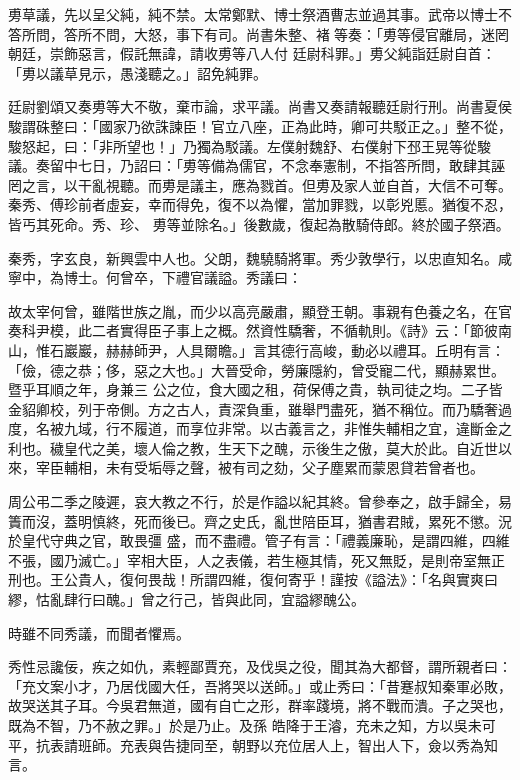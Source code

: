 \begin{pinyinscope}
 旉草議，先以呈父純，純不禁。太常鄭默、博士祭酒曹志並過其事。武帝以博士不答所問，答所不問，大怒，事下有司。尚書朱整、褚等奏：「旉等侵官離局，迷罔朝廷，崇飾惡言，假託無諱，請收旉等八人付
 廷尉科罪。」旉父純詣廷尉自首：「旉以議草見示，愚淺聽之。」詔免純罪。



 廷尉劉頌又奏旉等大不敬，棄市論，求平議。尚書又奏請報聽廷尉行刑。尚書夏侯駿謂硃整曰：「國家乃欲誅諫臣！官立八座，正為此時，卿可共駁正之。」整不從，駿怒起，曰：「非所望也！」乃獨為駁議。左僕射魏舒、右僕射下邳王晃等從駿議。奏留中七日，乃詔曰：「旉等備為儒官，不念奉憲制，不指答所問，敢肆其誣罔之言，以干亂視聽。而旉是議主，應為戮首。但旉及家人並自首，大信不可奪。秦秀、傅珍前者虛妄，幸而得免，復不以為懼，當加罪戮，以彰兇慝。猶復不忍，皆丐其死命。秀、珍、
 旉等並除名。」後數歲，復起為散騎侍郎。終於國子祭酒。



 秦秀，字玄良，新興雲中人也。父朗，魏驍騎將軍。秀少敦學行，以忠直知名。咸寧中，為博士。何曾卒，下禮官議謚。秀議曰：



 故太宰何曾，雖階世族之胤，而少以高亮嚴肅，顯登王朝。事親有色養之名，在官奏科尹模，此二者實得臣子事上之概。然資性驕奢，不循軌則。《詩》云：「節彼南山，惟石巖巖，赫赫師尹，人具爾瞻。」言其德行高峻，動必以禮耳。丘明有言：「儉，德之恭；侈，惡之大也。」大晉受命，勞廉隱約，曾受寵二代，顯赫累世。暨乎耳順之年，身兼三
 公之位，食大國之租，荷保傅之貴，執司徒之均。二子皆金貂卿校，列于帝側。方之古人，責深負重，雖舉門盡死，猶不稱位。而乃驕奢過度，名被九域，行不履道，而享位非常。以古義言之，非惟失輔相之宜，違斷金之利也。穢皇代之美，壞人倫之教，生天下之醜，示後生之傲，莫大於此。自近世以來，宰臣輔相，未有受垢辱之聲，被有司之劾，父子塵累而蒙恩貸若曾者也。



 周公弔二季之陵遲，哀大教之不行，於是作謚以紀其終。曾參奉之，啟手歸全，易簀而沒，蓋明慎終，死而後已。齊之史氏，亂世陪臣耳，猶書君賊，累死不懲。況於皇代守典之官，敢畏彊
 盛，而不盡禮。管子有言：「禮義廉恥，是謂四維，四維不張，國乃滅亡。」宰相大臣，人之表儀，若生極其情，死又無貶，是則帝室無正刑也。王公貴人，復何畏哉！所謂四維，復何寄乎！謹按《謚法》：「名與實爽曰繆，怙亂肆行曰醜。」曾之行己，皆與此同，宜謚繆醜公。



 時雖不同秀議，而聞者懼焉。



 秀性忌讒佞，疾之如仇，素輕鄙賈充，及伐吳之役，聞其為大都督，謂所親者曰：「充文案小才，乃居伐國大任，吾將哭以送師。」或止秀曰：「昔蹇叔知秦軍必敗，故哭送其子耳。今吳君無道，國有自亡之形，群率踐境，將不戰而潰。子之哭也，既為不智，乃不赦之罪。」於是乃止。及孫
 皓降于王濬，充未之知，方以吳未可平，抗表請班師。充表與告捷同至，朝野以充位居人上，智出人下，僉以秀為知言。




\end{pinyinscope}
